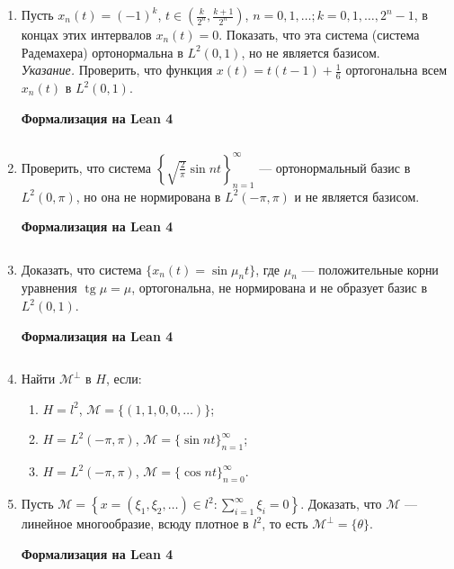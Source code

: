 \documentclass[12pt,a4paper]{article}
\begin{document}
\begin{enumerate}
\begin{center}\small\textbf{Формализация на Lean 4}\end{center}
\inputminted{lean}{FunAn/Section12_HilbertSpaces/Task12.lean}

\newpage
\item Пусть $x_{n}(t)=(-1)^{k}$, $t\in\left(\frac{k}{2^{n}},\frac{k+1}{2^{n}}\right)$, $n=0,1,\dots; k=0,1,\dots,2^{n}-1$, в концах этих интервалов $x_{n}(t)=0$. Показать, что эта система (система Радемахера) ортонормальна в $L^{2}(0,1)$, но не является базисом.\\
\textit{Указание.} Проверить, что функция $x(t)=t(t-1)+\frac{1}{6}$ ортогональна всем $x_{n}(t)$ в $L^{2}(0,1)$.

\begin{center}\small\textbf{Формализация на Lean 4}\end{center}
\inputminted{lean}{FunAn/Section12_HilbertSpaces/Task13.lean}

\newpage
\item Проверить, что система $\left\{\sqrt{\frac{2}{\pi}}\sin nt\right\}_{n=1}^{\infty}$ — ортонормальный базис в $L^{2}(0,\pi)$, но она не нормирована в $L^{2}(-\pi,\pi)$ и не является базисом.

\begin{center}\small\textbf{Формализация на Lean 4}\end{center}
\inputminted{lean}{FunAn/Section12_HilbertSpaces/Task14.lean}

\newpage
\item Доказать, что система $\{x_{n}(t)=\sin \mu_{n}t\}$, где $\mu_{n}$ — положительные корни уравнения $\operatorname{tg} \mu=\mu$, ортогональна, не нормирована и не образует базис в $L^{2}(0,1)$.

\begin{center}\small\textbf{Формализация на Lean 4}\end{center}
\inputminted{lean}{FunAn/Section12_HilbertSpaces/Task15.lean}

\newpage

\item Найти $\mathcal{M}^{\perp}$ в $H$, если:
\begin{enumerate}[label=\alph*)]
\item $H=l^{2}$, $\mathcal{M}=\{(1,1,0,0,\dots)\}$;
\item $H=L^{2}(-\pi,\pi)$, $\mathcal{M}=\{\sin nt\}_{n=1}^{\infty}$;
\item $H=L^{2}(-\pi,\pi)$, $\mathcal{M}=\{\cos nt\}_{n=0}^{\infty}$.
\end{enumerate}
\newpage
\item Пусть $\mathcal{M}=\left\{x=(\xi_{1},\xi_{2},\dots)\in l^{2} : \sum_{i=1}^{\infty}\xi_{i}=0\right\}$. Доказать, что $\mathcal{M}$ — линейное многообразие, всюду плотное в $l^{2}$, то есть $\mathcal{M}^{\perp}=\{\theta\}$.

\begin{center}\small\textbf{Формализация на Lean 4}\end{center}
\inputminted{lean}{FunAn/Section12_HilbertSpaces/Task17.lean}

\end{enumerate}
\end{document}
